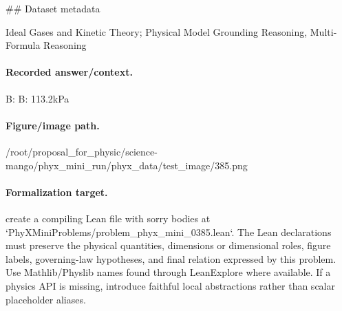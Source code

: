 \#\# Dataset metadata

Ideal Gases and Kinetic Theory; Physical Model Grounding Reasoning, Multi-Formula Reasoning

\paragraph{Recorded answer/context.}
B: B: 113.2kPa

\paragraph{Figure/image path.}
/root/proposal\_for\_physic/science-mango/phyx\_mini\_run/phyx\_data/test\_image/385.png

\paragraph{Formalization target.}
create a compiling Lean file with sorry bodies at `PhyXMiniProblems/problem\_phyx\_mini\_0385.lean`. The Lean declarations must preserve the physical quantities, dimensions or dimensional roles, figure labels, governing-law hypotheses, and final relation expressed by this problem.
Use Mathlib/Physlib names found through LeanExplore where available. If a physics API is missing, introduce faithful local abstractions rather than scalar placeholder aliases.


